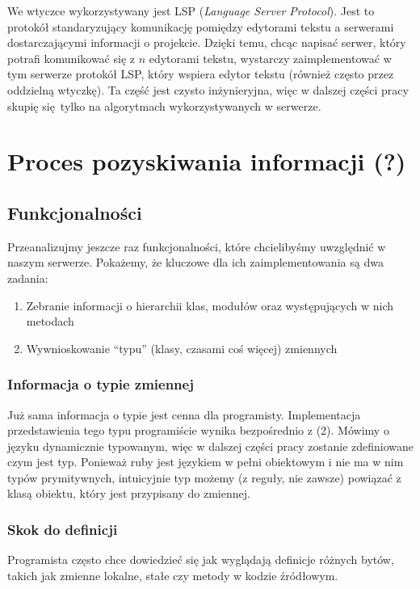 \documentclass[declaration,shortabstract]{iithesis}
\begin{document}
We wtyczce wykorzystywany jest LSP (\textit{Language Server Protocol}).
Jest to protokół standaryzujący komunikację pomiędzy edytorami tekstu a serwerami dostarczającymi informacji o projekcie.
Dzięki temu, chcąc napisać serwer, który potrafi komunikować się z $n$ edytorami tekstu, wystarczy zaimplementować w tym serwerze protokół LSP, który wspiera edytor tekstu (również często przez oddzielną wtyczkę). Ta część jest czysto inżynieryjna, więc w dalszej części pracy skupię się tylko na algorytmach wykorzystywanych w serwerze.

\section{Proces pozyskiwania informacji (?)}

\subsection{Funkcjonalności}

Przeanalizujmy jeszcze raz funkcjonalności, które chcielibyśmy uwzględnić w naszym serwerze. Pokażemy, że kluczowe  dla ich zaimplementowania są dwa zadania:
\begin{enumerate}
\item Zebranie informacji o hierarchii klas, modułów oraz występujących w nich metodach
\item Wywnioskowanie ``typu'' (klasy, czasami coś więcej) zmiennych
\end{enumerate}

\subsubsection{Informacja o typie zmiennej}

Już sama informacja o typie jest cenna dla programisty. Implementacja przedstawienia tego typu programiście wynika bezpośrednio z (2).
Mówimy o języku dynamicznie typowanym, więc w dalszej części pracy zostanie zdefiniowane czym jest typ. Ponieważ ruby jest językiem w pełni obiektowym i nie ma w nim typów prymitywnych, intuicyjnie typ możemy (z reguły, nie zawsze) powiązać z klasą obiektu, który jest przypisany do zmiennej.

\subsubsection{Skok do definicji}

Programista często chce dowiedzieć się jak wyglądają definicje różnych bytów, takich jak zmienne lokalne, stałe czy metody w kodzie źródłowym.
\end{document}
